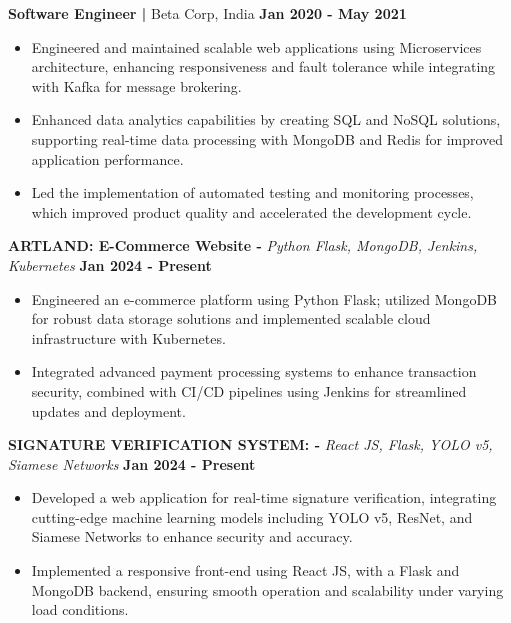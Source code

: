 \documentclass{article}
\begin{document}
\noindent \textbf{Software Engineer | } Beta Corp, India  \hfill \textbf{Jan 2020 - May 2021}
\begin{itemize}[noitemsep,nolistsep,leftmargin=*]
\item {\small Engineered and maintained scalable web applications using Microservices architecture, enhancing responsiveness and fault tolerance while integrating with Kafka for message brokering.}
\item {\small Enhanced data analytics capabilities by creating SQL and NoSQL solutions, supporting real-time data processing with MongoDB and Redis for improved application performance.}
\item {\small Led the implementation of automated testing and monitoring processes, which improved product quality and accelerated the development cycle.}\\
\end{itemize}


\noindent \textbf{ARTLAND: E-Commerce Website -} \textit{Python Flask, MongoDB, Jenkins, Kubernetes} \hfill \textbf{Jan 2024 - Present}
\begin{itemize}[noitemsep,nolistsep,leftmargin=*]
\item {\small Engineered an e-commerce platform using Python Flask; utilized MongoDB for robust data storage solutions and implemented scalable cloud infrastructure with Kubernetes.}
\item {\small Integrated advanced payment processing systems to enhance transaction security, combined with CI/CD pipelines using Jenkins for streamlined updates and deployment.}
\end{itemize}

\noindent \textbf{SIGNATURE VERIFICATION SYSTEM: -} \textit{React JS, Flask, YOLO v5, Siamese Networks} \hfill \textbf{Jan 2024 - Present}
\begin{itemize}[noitemsep,nolistsep,leftmargin=*]
\item {\small Developed a web application for real-time signature verification, integrating cutting-edge machine learning models including YOLO v5, ResNet, and Siamese Networks to enhance security and accuracy.}
\item {\small Implemented a responsive front-end using React JS, with a Flask and MongoDB backend, ensuring smooth operation and scalability under varying load conditions.}
\end{itemize}
\end{document}

